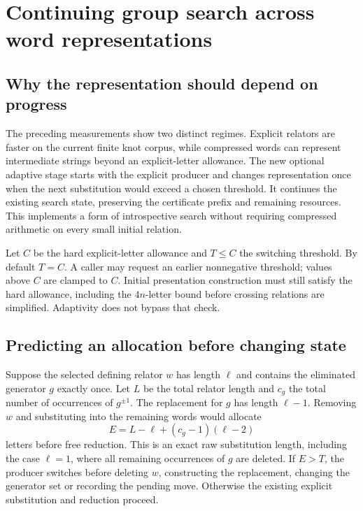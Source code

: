 \section{Continuing group search across word representations}
\label{sec:adaptive-group}

\subsection{Why the representation should depend on progress}

The preceding measurements show two distinct regimes. Explicit relators
are faster on the current finite knot corpus, while compressed words can
represent intermediate strings beyond an explicit-letter allowance.
The new optional adaptive stage starts with the explicit producer and
changes representation once when the next substitution would exceed a
chosen threshold. It continues the existing search state, preserving the
certificate prefix and remaining resources. This implements a form of
introspective search without requiring compressed arithmetic on every
small initial relation.

Let $C$ be the hard explicit-letter allowance and $T\le C$ the switching
threshold. By default $T=C$. A caller may request an earlier nonnegative
threshold; values above $C$ are clamped to $C$. Initial presentation
construction must still satisfy the hard allowance, including the
$4n$-letter bound before crossing relations are simplified. Adaptivity
does not bypass that check.

\subsection{Predicting an allocation before changing state}

Suppose the selected defining relator $w$ has length $\ell$ and contains
the eliminated generator $g$ exactly once. Let $L$ be the total relator
length and $c_g$ the total number of occurrences of $g^{\pm1}$. The
replacement for $g$ has length $\ell-1$. Removing $w$ and substituting
into the remaining words would allocate
\[
 E=L-\ell+(c_g-1)(\ell-2)
\]
letters before free reduction. This is an exact raw substitution length,
including the case $\ell=1$, where all remaining occurrences of $g$ are
deleted. If $E>T$, the producer switches before deleting $w$, constructing
the replacement, changing the generator set or recording the pending move.
Otherwise the existing explicit substitution and reduction proceed.

